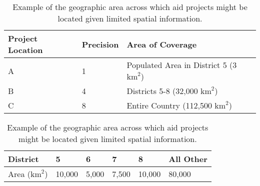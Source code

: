 \begin{table}[!htbp]
	\begin{tabular}{| l | l | l |}
	\hline
	Project Location & Precision & Area of Coverage\\
    \hline
    A &  1 & Populated Area in District 5 (3 $\text{km}^2$) \\ \hline
    B &  4 & Districts 5-8 (32,000 $\text{km}^2$) \\ \hline
    C &  8 & Entire Country (112,500 $\text{km}^2$) \\ \hline
	\end{tabular}
\doublespacing

\onehalfspacing
	\begin{tabular}{| l | l | l | l | l | l |}
    \hline
    District & 5 & 6 & 7 & 8 & All Other \\ \hline
    Area ($\text{km}^2$) & 10,000 & 5,000 & 7,500 & 10,000 & 80,000 \\
    \hline
	\end{tabular}
	\caption{Example of the geographic area across which aid projects might be located given limited spatial information.}\label{precision_example}
\end{table}
